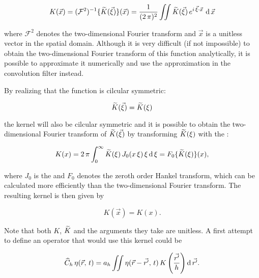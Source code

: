 \begin{equation} \label{eq:kernelfour2d}
K(\vec{x}) = (\mathcal{F}^2)^{-1}\{\widetilde{K}(\vec{\xi})\}(\vec{x}) = \frac{1}{(2\,\pi)^2}\iint\widetilde{K}(\vec{\xi})\,e^{i\,\vec{\xi}\cdot\vec{x}}\,\operatorname{d}\vec{x}
\end{equation}

where $\mathcal{F}^2$ denotes the two-dimensional Fourier transform and $\vec{x}$ is a unitless vector in the spatial domain. Although it is very difficult (if not impossible) to obtain the two-dimensional Fourier transform of this function analytically, it is possible to approximate it numerically and use the approximation in the convolution filter instead.

By realizing that the function is cilcular symmetric:

\begin{equation} \label{eq:transkernelsymmetry}
\widetilde{K}(\vec{\xi}) = \widetilde{K}(\xi)
\end{equation}

the kernel will also be cilcular symmetric and it is possible to obtain the two-dimensional Fourier transform of $\widetilde{K}(\vec{\xi})$ by transforming $\widetilde{K}(\xi)$ with the :

\begin{equation} \label{eq:kernelhankel}
K(x) = 2\,\pi\int_0^\infty \widetilde{K}(\xi)\,J_0(
x\,\xi)\,\xi\operatorname{d}\xi = F_0\{\widetilde{K}(\xi)\}(x),
\end{equation}

where $J_0$ is the  and $F_0$ denotes the zeroth order Hankel transform, which can be calculated more efficiently than the two-dimensional Fourier transform. The resulting kernel is then given by

\begin{equation} \label{eq:kernelsymmetry}
K(\vec{x}) = K(x).
\end{equation}

Note that both $K$, $\widetilde{K}$ and the arguments they take are unitless. A first attempt to define an operator that would use this kernel could be

\begin{equation} \label{eq:opchunknown}
\widehat{C}_h\,\eta(\vec{r},\,t) = a_h\iint\eta(\vec{r}-\vec{r'},\,t)\,K\left(\frac{\vec{r'}}{h}\right) \operatorname{d}\vec{r'}.
\end{equation}

